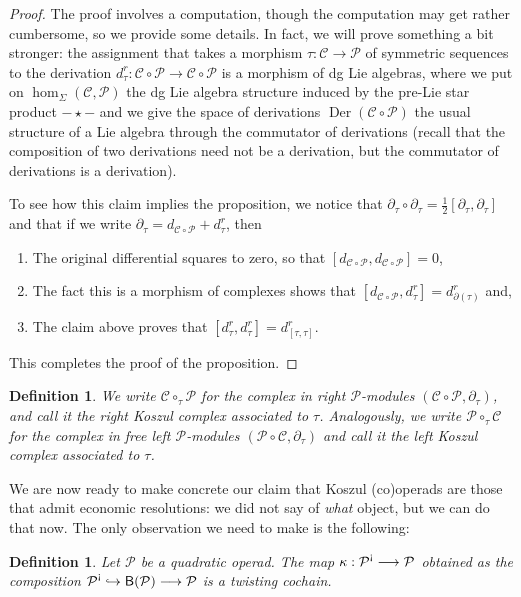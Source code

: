 \documentclass[fleqn, a4paper, twoside]{article}
\newcommand{\antishriek}{\text{\raisebox{\depth}{\textexclamdown}}}
\newcommand{\0}{\langle 0\rangle}
\newcommand{\B}[1]{\mathsf{B}(#1)}
\newenvironment{tenumerate}{
 \begin{enumerate}
  \setlength{\itemsep}{0pt}
  \setlength{\parskip}{0pt}
}{\end{enumerate}}
\DeclareRobustCommand{\[}{\begin{equation}}%
\DeclareRobustCommand{\]}{\end{equation}}%
\theoremstyle{mytheorem}
\theoremstyle{introthm}
\newcommand{\hacer}[1]{\todo[inline,linecolor=blue,backgroundcolor=blue!25!white,bordercolor=blue]{#1}}
\theoremstyle{mydefinition}
\newtheorem{definition}[theorem]{Definition}
\theoremstyle{mydefinition2}
\theoremstyle{plain} %
\newcommand{\CC}{\mathcal{C}}
\newcommand{\?}{\,?\,}
\newcommand{\PP}{{\mathcal{P}}}
\theoremstyle{mytheorem}
\theoremstyle{plain} %
\begin{document}
\begin{proof}
The proof involves a computation, though the computation may get
rather cumbersome, so we provide some details. In fact, we will
prove something a bit stronger: the assignment that takes 
a morphism $\tau : \CC\longrightarrow \PP$ of symmetric
sequences to the derivation $d_\tau^r : \CC\circ\PP \longrightarrow
\CC\circ \PP$ is a morphism of dg Lie algebras, where we put
on $\hom_\Sigma(\CC,\PP)$ the dg Lie algebra structure induced by
the pre-Lie star product $-\star-$ and we give the space of
derivations $\operatorname{Der}(\CC\circ\PP)$ the usual
structure of a Lie algebra through the commutator of
derivations (recall that the composition of two derivations
need not be a derivation, but the commutator of derivations
is a derivation).

To see how this claim implies the proposition, we notice
that $\partial_\tau\circ\partial_\tau = \frac{1}{2}[\partial_\tau,\partial_\tau]$
and that if we write $\partial_\tau = d_{\CC\circ\PP} + d_\tau^r$, then
\begin{tenumerate}
\item The original differential squares to zero, so that $[d_{\CC\circ\PP},d_{\CC\circ\PP}] = 0$,
\item The fact this is a morphism of complexes shows that $[d_{\CC\circ\PP},d_\tau^r] = d_{\partial(\tau)}^r$ and,
\item The claim above proves that $[d_\tau^r,d_\tau^r] = d_{[\tau,\tau]}^r$.
\end{tenumerate}
\hacer{Prove the stronger claim.}
This completes the proof of the proposition.
\end{proof}

\begin{definition}
We write $\CC\circ_\tau \PP$ for the complex in right $\PP$-modules
$(\CC\circ \PP,\partial_\tau)$, and call it the \emph{right Koszul
complex associated to $\tau$}. Analogously, we write $\PP\circ_\tau \CC$
for the complex in free left $\PP$-modules $(\PP\circ \CC,\partial_\tau)$
and call it the \emph{left Koszul complex associated to $\tau$}.
\end{definition}

We are now ready to make concrete our claim that Koszul (co)operads are
those that admit economic resolutions: we did not say of \emph{what}
object, but we can do that now. The only observation we need to make
is the following:

\begin{definition}
Let $\PP$ be a quadratic operad. The map $\kappa : \PP^\antishriek
\longrightarrow \PP$ obtained as the composition
$\PP^\antishriek \hookrightarrow \B{\PP} \longrightarrow \PP$
is a twisting cochain.
\end{definition} 
\end{document}
